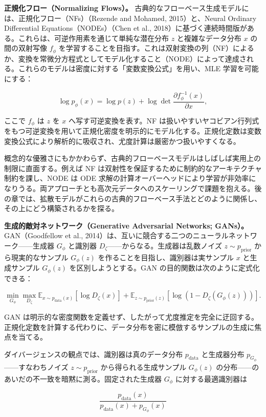 \textbf{正規化フロー（Normalizing Flows）。} 古典的なフローベース生成モデルには、正規化フロー（NFs）（Rezende and Mohamed, 2015）と、Neural Ordinary Differential Equations（NODEs）（Chen et al., 2018）に基づく連続時間版がある。これらは、可逆作用素を通じて単純な潜在分布 $z$ と複雑なデータ分布 $x$ の間の双射写像 $f_\phi$ を学習することを目指す。これは双射変換の列（NF）によるか、変換を常微分方程式としてモデル化すること（NODE）によって達成される。これらのモデルは密度に対する「変数変換公式」を用い、MLE 学習を可能にする：

\[
\log p_\phi(x)=\log p(z)+\log\det\frac{\partial f_\phi^{-1}(x)}{\partial x},
\]


ここで $f_\phi$ は $z$ を $x$ へ写す可逆変換を表す。NF は扱いやすいヤコビアン行列式をもつ可逆変換を用いて正規化密度を明示的にモデル化する。正規化定数は変数変換公式により解析的に吸収され、尤度計算は厳密かつ扱いやすくなる。

概念的な優雅さにもかかわらず、古典的フローベースモデルはしばしば実用上の制限に直面する。例えば NF は双射性を保証するために制約的なアーキテクチャ制約を課し、NODE は ODE 求解の計算オーバーヘッドにより学習が非効率になりうる。両アプローチとも高次元データへのスケーリングで課題を抱える。後の章では、拡散モデルがこれらの古典的フローベース手法とどのように関係し、その上にどう構築されるかを探る。

\textbf{生成的敵対ネットワーク（Generative Adversarial Networks; GANs）。} GAN（Goodfellow et al., 2014）は、互いに競合する二つのニューラルネットワーク——生成器 $G_\phi$ と識別器 $D_\zeta$——からなる。生成器は乱数ノイズ $z\sim p_{\mathrm{prior}}$ から現実的なサンプル $G_\phi(z)$ を作ることを目指し、識別器は実サンプル $x$ と生成サンプル $G_\phi(z)$ を区別しようとする。GAN の目的関数は次のように定式化できる：

\[
\min_{G_\phi}\max_{D_\zeta}
\mathbb{E}_{x\sim p_{\mathrm{data}}(x)}[\log D_\zeta(x)]
+ \mathbb{E}_{z\sim p_{\mathrm{prior}}(z)}[\log(1-D_\zeta(G_\phi(z)))].
\]


GAN は明示的な密度関数を定義せず、したがって尤度推定を完全に迂回する。正規化定数を計算する代わりに、データ分布を密に模倣するサンプルの生成に焦点を当てる。

ダイバージェンスの観点では、識別器は真のデータ分布 $p_{\mathrm{data}}$ と生成器分布 $p_{G_\phi}$——すなわちノイズ $z\sim p_{\mathrm{prior}}$ から得られる生成サンプル $G_\phi(z)$ の分布——のあいだの不一致を暗黙に測る。固定された生成器 $G_\phi$ に対する最適識別器は

\[
\frac{p_{\mathrm{data}}(x)}{p_{\mathrm{data}}(x)+p_{G_\phi}(x)}
\]


